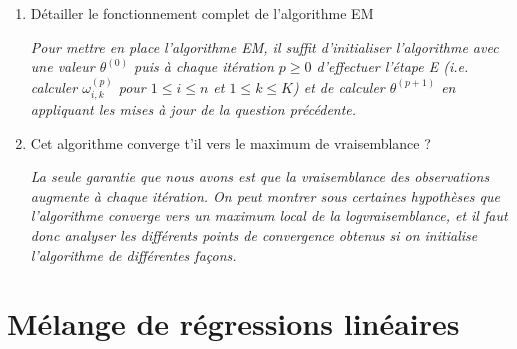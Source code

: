 \documentclass[a4paper,10pt,fleqn]{article}
\newcommand{\1}{\ensuremath{\mathbbm{1}}}
\begin{document}
\begin{enumerate}
\begin{enumerate}
\vspace{.2cm}

{\em Il est ais\'e de montrer que la fonction $\theta \mapsto Q(\theta;\theta^{(p)}) $ admet un maximum unique, obtenu en r\'esolvant l'\'equation $\nabla_\theta Q(\theta;\theta^{(p)}) = 0$. Pour tout $1\leq k \leq K$,
$$
\partial_{\lambda_k}Q(\theta;\theta^{(p)}) = \sum_{i=1}^n\omega_{i,k}^{(p)}(X_i) \left\{ - 1+ \frac{X_i}{\lambda_k}\right\}\,.
$$
On en d\'eduit que
$$
\lambda^{(p+1)}_k = \frac{\sum_{i=1}^n\omega_{i,k}^{(p)}(X_i)X_i}{\sum_{i=1}^n\omega_{i,k}^{(p)}(X_i)}\,.
$$
Par ailleurs, pour tout $1\leq k \leq K-1$, en utilisant que $\pi_K = 1 - \sum_{j=1}^{K-1}\pi_j$,
$$
\partial_{\pi_k}Q(\theta;\theta^{(p)}) = \sum_{i=1}^n \left\{\frac{\omega_{i,k}^{(p)}(X_i)}{\pi_k} - \frac{\omega_{i,K}^{(p)}(X_i)}{\pi_K}\right\}
$$
et on en d\'eduit que $k\mapsto\sum_{i=1}^n\omega_{i,k}^{(p)}(X_i)/\pi_k$ est constante. En utilisant par ailleurs que  $\sum_{k=1}^{K}\pi_k = 1$ et $\sum_{k=1}^{K}\omega_{i,k}^{(p)}(X_i)= 1$, on a
$$
\pi_k^{(p+1)} = \frac{1}{n}\sum_{i=1}^n\omega_{i,k}^{(p)}(X_i)\,.
$$} 
\item D\'etailler le fonctionnement complet de l'algorithme EM

\vspace{.2cm}

{\em Pour mettre en place l'algorithme EM, il suffit d'initialiser l'algorithme avec une valeur $\theta^{(0)}$ puis \`a chaque it\'eration $p\geq 0$ d'effectuer l'\'etape E (i.e. calculer $\omega_{i,k}^{(p)}$ pour $1\leq i \leq n$ et $1\leq k \leq K$) et de calculer $\theta^{(p+1)}$ en appliquant les mises \`a jour de la question pr\'ec\'edente.}
\item Cet algorithme converge t'il vers le maximum de vraisemblance ?

\vspace{.2cm}

{\em La seule garantie que nous avons est que la vraisemblance des observations augmente \`a chaque it\'eration. On peut montrer sous certaines hypoth\`eses que  l'algorithme converge vers un maximum local de la logvraisemblance, et il faut donc analyser les diff\'erents points de convergence obtenus si on initialise l'algorithme de diff\'erentes fa\c cons. }
\end{enumerate}
\end{enumerate}

\section*{M\'elange de r\'egressions lin\'eaires}
\end{document}
